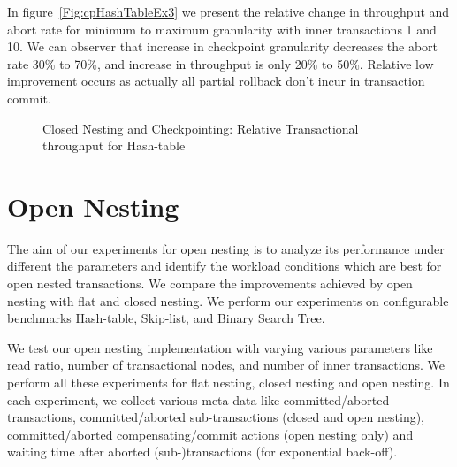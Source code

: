 \documentclass[12pt,english]{report}
\begin{document}
In figure~\ref{Fig:cpHashTableEx3} we present the relative change in throughput and abort rate for minimum to maximum granularity with inner transactions 1 and 10. We can observer that increase in checkpoint granularity decreases the abort rate 30\% to 70\%, and increase in throughput is only 20\% to 50\%. Relative low improvement occurs as actually all partial rollback don't incur in transaction commit.

\begin{figure}[H]
\centering
{}
\end{figure}
\begin{figure}[H]
\centering
{}
\end{figure}
\begin{figure}[H]
\centering
{}
\caption{Closed Nesting and Checkpointing: Relative Transactional throughput for Hash-table}
\label{Fig:cpHashTable}
\end{figure}

\section{Open Nesting}

The aim of our experiments for open nesting is to analyze its performance under different the parameters  and identify the workload conditions which are best for open nested transactions. We compare the improvements achieved by open nesting with flat and closed nesting. We perform our experiments on configurable benchmarks Hash-table, Skip-list, and Binary Search Tree.

We test our open nesting implementation with varying various parameters like read ratio, number of transactional nodes, and number of inner transactions. We perform all these experiments for flat nesting, closed nesting and open nesting. In each experiment, we collect various meta data like committed/aborted transactions, committed/aborted sub-transactions (closed and open nesting), committed/aborted compensating/commit actions (open nesting only) and waiting time after aborted (sub-)transactions (for exponential back-off).
\end{document}

